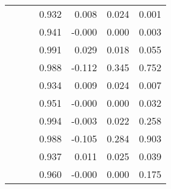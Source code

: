 \documentclass{svjour3}                     %
\begin{document}
\begin{table}[ht]
\begin{tabular}{lllrrrr}
   &  &  & 0.932 & 0.008 & 0.024 & 0.001 \\ 
   &  &  & 0.941 & -0.000 & 0.000 & 0.003 \\ 
   \hline
   &  &  & 0.991 & 0.029 & 0.018 & 0.055 \\ 
   &  &  & 0.988 & -0.112 & 0.345 & 0.752 \\ 
   &  &  & 0.934 & 0.009 & 0.024 & 0.007 \\ 
   &  &  & 0.951 & -0.000 & 0.000 & 0.032 \\ 
   \hline
   &  &  & 0.994 & -0.003 & 0.022 & 0.258 \\ 
   &  &  & 0.988 & -0.105 & 0.284 & 0.903 \\ 
   &  &  & 0.937 & 0.011 & 0.025 & 0.039 \\ 
   &  &  & 0.960 & -0.000 & 0.000 & 0.175 \\ 
   \hline
\end{tabular}
\end{table}
\end{document}
